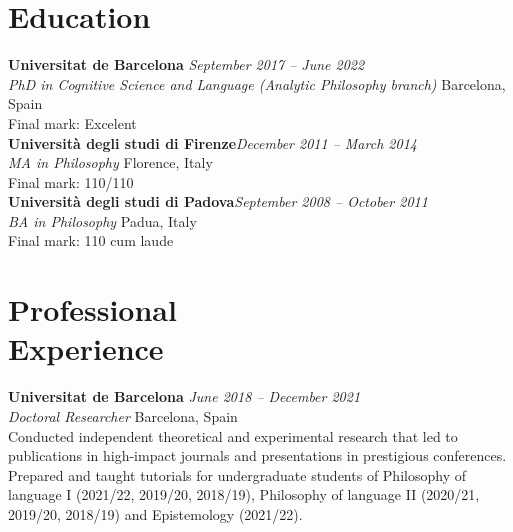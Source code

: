 \documentclass[margin,line]{resume}
\begin{document}
\begin{resume}
    \vspace{-2mm}%

    \section{\mysidestyle Education}
    \textbf{Universitat de Barcelona} \hfill \textit{September 2017 -- June 2022}\\
    \textsl{PhD in Cognitive Science and Language (Analytic Philosophy branch)} \hfill Barcelona, Spain\\
    Final mark: Excelent\vspace{1mm}\\%
    \textbf{Universit\`a degli studi di Firenze}\hfill \textit{December 2011 -- March 2014}\\
    \textsl{MA in Philosophy} \hfill Florence, Italy\\
    Final mark: 110/110\vspace{1mm}\\%
    \textbf{Universit\`a degli studi di Padova}\hfill \textit{September 2008 -- October 2011}\\
    \textsl{BA in Philosophy} \hfill Padua, Italy\\
    Final mark: 110 cum laude\vspace{-2mm}%

    \section{\mysidestyle Professional\\Experience}
    \textbf{Universitat de Barcelona} \hfill \textit{June 2018 -- December 2021}\\
    \textsl{Doctoral Researcher} \hfill Barcelona, Spain\\
    Conducted independent theoretical and experimental research that
    led to publications in high-impact journals and presentations in
    prestigious conferences.\vspace{1mm}\\%
    Prepared and taught tutorials for undergraduate students of
    Philosophy of language I (2021/22, 2019/20, 2018/19), Philosophy
    of language II (2020/21, 2019/20, 2018/19) and Epistemology
    (2021/22).\vspace{-2mm}%


\end{resume}
\end{document}
